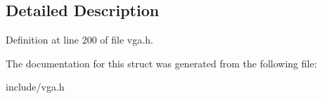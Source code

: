 \subsection{Detailed Description}


Definition at line 200 of file vga.\-h.



The documentation for this struct was generated from the following file\-:\begin{DoxyCompactItemize}
\item 
include/vga.\-h\end{DoxyCompactItemize}
